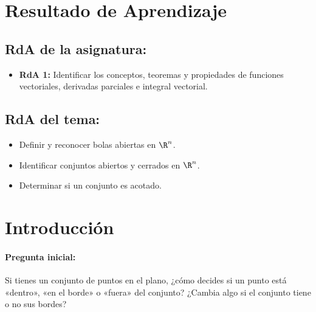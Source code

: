 \documentclass[a4,11pt]{aleph-notas}
\begin{document}
\encabezado

\section*{Resultado de Aprendizaje}

\subsection*{RdA de la asignatura:}
\begin{itemize}[leftmargin=*]
    \item \textbf{RdA 1:} Identificar los conceptos, teoremas y propiedades de funciones vectoriales, derivadas parciales e integral vectorial.
\end{itemize}

\subsection*{RdA del tema:}
\begin{itemize}[leftmargin=*]
    \item Definir y reconocer bolas abiertas en $\R^n$.
    \item Identificar conjuntos abiertos y cerrados en $\R^n$.
    \item Determinar si un conjunto es acotado.
\end{itemize}

\section*{Introducción}

\paragraph{Pregunta inicial:}
Si tienes un conjunto de puntos en el plano, ¿cómo decides si un punto está «dentro», «en el borde» o «fuera» del conjunto? ¿Cambia algo si el conjunto tiene o no sus bordes?
\end{document}
